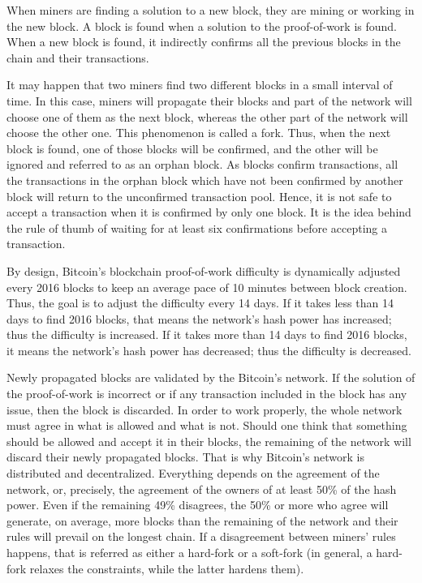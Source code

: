 When miners are finding a solution to a new block, they are mining or working in the new block. A block is found when a solution to the proof-of-work is found. When a new block is found, it indirectly confirms all the previous blocks in the chain and their transactions.

It may happen that two miners find two different blocks in a small interval of time. In this case, miners will propagate their blocks and part of the network will choose one of them as the next block, whereas the other part of the network will choose the other one. This phenomenon is called a fork. Thus, when the next block is found, one of those blocks will be confirmed, and the other will be ignored and referred to as an orphan block. As blocks confirm transactions, all the transactions in the orphan block which have not been confirmed by another block will return to the unconfirmed transaction pool. Hence, it is not safe to accept a transaction when it is confirmed by only one block. It is the idea behind the rule of thumb of waiting for at least six confirmations before accepting a transaction.

By design, Bitcoin's blockchain proof-of-work difficulty is dynamically adjusted every 2016 blocks to keep an average pace of 10 minutes between block creation. Thus, the goal is to adjust the difficulty every 14 days. If it takes less than 14 days to find 2016 blocks, that means the network's hash power has increased; thus the difficulty is increased. If it takes more than 14 days to find 2016 blocks, it means the network's hash power has decreased; thus the difficulty is decreased.

Newly propagated blocks are validated by the Bitcoin's network. If the solution of the proof-of-work is incorrect or if any transaction included in the block has any issue, then the block is discarded. In order to work properly, the whole network must agree in what is allowed and what is not. Should one think that something should be allowed and accept it in their blocks, the remaining of the network will discard their newly propagated blocks. That is why Bitcoin's network is distributed and decentralized. Everything depends on the agreement of the network, or, precisely, the agreement of the owners of at least 50\% of the hash power. Even if the remaining 49\% disagrees, the 50\% or more who agree will generate, on average, more blocks than the remaining of the network and their rules will prevail on the longest chain. If a disagreement between miners' rules happens, that is referred as either a hard-fork or a soft-fork (in general, a hard-fork relaxes the constraints, while the latter hardens them).

